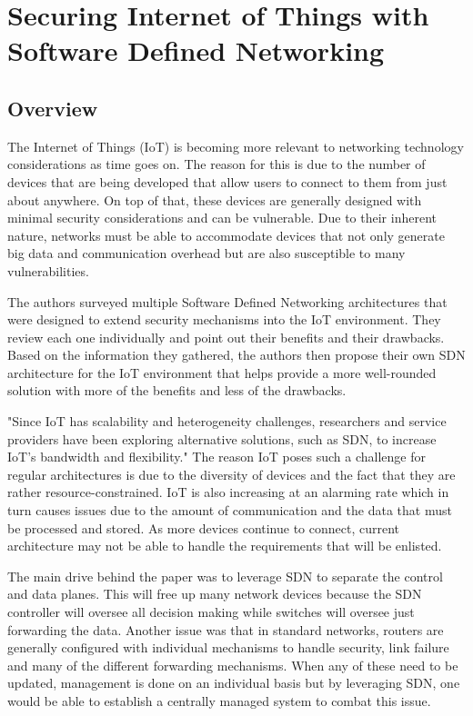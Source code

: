 \section {Securing Internet of Things with Software Defined Networking}
\subsection {Overview}
\smallskip

The Internet of Things (IoT) is becoming more relevant to networking technology considerations as time goes on. The reason for this is due to the number of devices that are being developed that allow users to connect to them from just about anywhere. On top of that, these devices are generally designed with minimal security considerations and can be vulnerable. Due to their inherent nature, networks must be able to accommodate devices that not only generate big data and communication overhead but are also susceptible to many vulnerabilities. 

\smallskip

The authors surveyed multiple Software Defined Networking architectures that were designed to extend security mechanisms into the IoT environment. They review each one individually and point out their benefits and their drawbacks. Based on the information they gathered, the authors then propose their own SDN architecture for the IoT environment that helps provide a more well-rounded solution with more of the benefits and less of the drawbacks.

\smallskip

"Since IoT has scalability and heterogeneity challenges, researchers and service providers have been exploring alternative solutions, such as SDN, to increase IoT's bandwidth and flexibility." \cite {kalkan2017securing} The reason IoT poses such a challenge for regular architectures is due to the diversity of devices and the fact that they are rather resource-constrained. IoT is also increasing at an alarming rate which in turn causes issues due to the amount of communication and the data that must be processed and stored. As more devices continue to connect, current architecture may not be able to handle the requirements that will be enlisted.

\smallskip

The main drive behind the paper was to leverage SDN to separate the control and data planes. This will free up many network devices because the SDN controller will oversee all decision making while switches will oversee just forwarding the data. Another issue was that in standard networks, routers are generally configured with individual mechanisms to handle security, link failure and many of the different forwarding mechanisms. When any of these need to be updated, management is done on an individual basis but by leveraging SDN, one would be able to establish a centrally managed system to combat this issue. 

